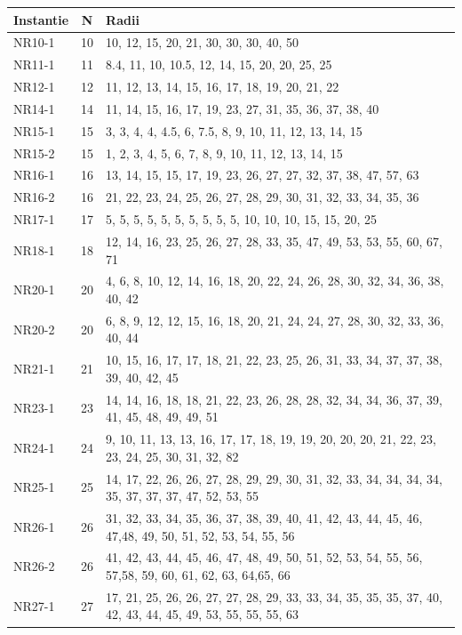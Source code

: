 \documentclass[12pt,a4paper,oneside]{book}
\begin{document}
\begin{tabularx}{\textwidth}{ l c X }
\caption{Packomania Benchmark Verdelingen}
\\\toprule
Instantie & N & Radii \\
\midrule
\endhead
NR10-1 & 10 & 10, 12, 15, 20, 21, 30, 30, 30, 40, 50 \\
NR11-1 & 11 & 8.4, 11, 10, 10.5, 12, 14, 15, 20, 20, 25, 25 \\
NR12-1 & 12 & 11, 12, 13, 14, 15, 16, 17, 18, 19, 20, 21, 22 \\
NR14-1 & 14 & 11, 14, 15, 16, 17, 19, 23, 27, 31, 35, 36, 37, 38, 40 \\
NR15-1 & 15 & 3, 3, 4, 4, 4.5, 6, 7.5, 8, 9, 10, 11, 12, 13, 14, 15 \\
NR15-2 & 15 & 1, 2, 3, 4, 5, 6, 7, 8, 9, 10, 11, 12, 13, 14, 15 \\
NR16-1 & 16 & 13, 14, 15, 15, 17, 19, 23, 26, 27, 27, 32, 37, 38, 47, 57, 63 \\
NR16-2 & 16 & 21, 22, 23, 24, 25, 26, 27, 28, 29, 30, 31, 32, 33, 34, 35, 36 \\
NR17-1 & 17 & 5, 5, 5, 5, 5, 5, 5, 5, 5, 5, 10, 10, 10, 15, 15, 20, 25 \\
NR18-1 & 18 & 12, 14, 16, 23, 25, 26, 27, 28, 33, 35, 47, 49, 53, 53, 55, 60, 67, 71 \\
NR20-1 & 20 & 4, 6, 8, 10, 12, 14, 16, 18, 20, 22, 24, 26, 28, 30, 32, 34, 36, 38, 40, 42 \\
NR20-2 & 20 & 6, 8, 9, 12, 12, 15, 16, 18, 20, 21, 24, 24, 27, 28, 30, 32, 33, 36, 40, 44 \\
NR21-1 & 21 & 10, 15, 16, 17, 17, 18, 21, 22, 23, 25, 26, 31, 33, 34, 37, 37, 38, 39, 40, 42, 45 \\
NR23-1 & 23 & 14, 14, 16, 18, 18, 21, 22, 23, 26, 28, 28, 32, 34, 34, 36, 37, 39, 41, 45, 48, 49, 49, 51 \\
NR24-1 & 24 & 9, 10, 11, 13, 13, 16, 17, 17, 18, 19, 19, 20, 20, 20, 21, 22, 23, 23, 24, 25, 30, 31, 32, 82 \\
NR25-1 & 25 & 14, 17, 22, 26, 26, 27, 28, 29, 29, 30, 31, 32, 33, 34, 34, 34, 34, 35, 37, 37, 37, 47, 52, 53, 55 \\
NR26-1 & 26 & 31, 32, 33, 34, 35, 36, 37, 38, 39, 40, 41, 42, 43, 44, 45, 46, 47,48, 49, 50, 51, 52, 53, 54, 55, 56 \\
NR26-2 & 26 & 41, 42, 43, 44, 45, 46, 47, 48, 49, 50, 51, 52, 53, 54, 55, 56, 57,58, 59, 60, 61, 62, 63, 64,65, 66 \\
NR27-1 & 27 & 17, 21, 25, 26, 26, 27, 27, 28, 29, 33, 33, 34, 35, 35, 35, 37, 40, 42, 43, 44, 45, 49, 53, 55, 55, 55, 63 \\

\end{tabularx}
\end{document}
